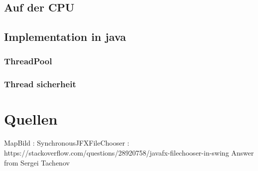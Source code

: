 \subsection{Auf der CPU}
\subsection{Implementation in java}
\subsubsection{ThreadPool}
\subsubsection{Thread sicherheit}

\section{Quellen}
MapBild :
SynchronousJFXFileChooser : https://stackoverflow.com/questions/28920758/javafx-filechooser-in-swing
Answer from Sergei Tachenov